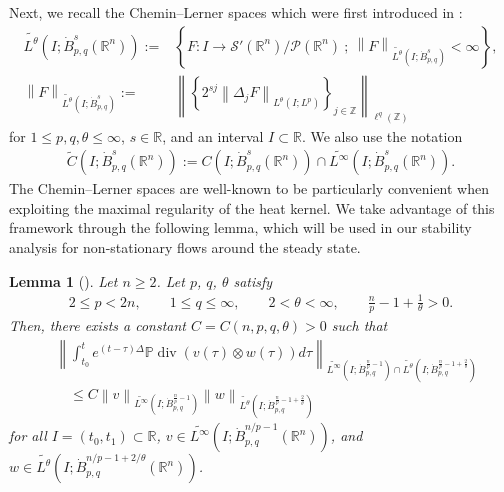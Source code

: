 \documentclass[a4paper,12pt,reqno]{amsart}
\theoremstyle{plain}
\newtheorem{lemm}[thm]{Lemma}
\theoremstyle{definition}
\renewcommand{\div}{\operatorname{div}}
\newcommand{\dB}{\dot{B}}
\renewcommand{\leq}{\leqslant}
\renewcommand{\geq}{\geqslant}
\newcommand{\n}[1]{{\left\|#1\right\|}}
\newcommand{\R}{\mathbb{R}}
\newcommand{\Mp}[1]{\left\{#1\right\}}
\begin{document}
Next, we recall 
the Chemin--Lerner spaces which were first introduced in \cite{Che-Ler-95}:
\begin{align}
    \widetilde{L^{\theta}}(I;\dB_{p,q}^s(\R^n))
    :={}&
    \Mp{
    F:I \to  \mathscr{S}'(\mathbb{R}^n)/\mathscr{P}(\mathbb{R}^n)
    \ ; \ 
    \n{F}_{\widetilde{L^{\theta}}(I;\dB_{p,q}^s)}
    <\infty
    },\\
    \n{F}_{\widetilde{L^{\theta}}(I;\dB_{p,q}^s)}
    :={}&
    \n{
    \Mp{
    2^{sj}
    \n{\Delta_j F}_{L^\theta(I;L^p)}
    }_{j \in \mathbb{Z}}
    }_{\ell^{q}(\mathbb{Z})}
\end{align}
for $1 \leq p,q,\theta \leq \infty$, $s \in \mathbb{R}$, and an interval $I \subset \R$.
We also use the notation
\begin{align}
    \widetilde{C}(I ; \dB_{p,q}^s(\mathbb{R}^n))
    :=
    C(I ; \dB_{p,q}^s(\mathbb{R}^n))
    \cap
    \widetilde{L^{\infty}}(I ; \dB_{p,q}^s(\mathbb{R}^n)).
\end{align}
The Chemin--Lerner spaces are well-known to be particularly convenient when exploiting the maximal regularity of the heat kernel. 
We take advantage of this framework through the following lemma, which will be used in our stability analysis for non-stationary flows around the steady state.
\begin{lemm}[\cite{Fuj-AIPHC}]\label{lemm:nonlin-Duha}
Let $n \geq 2$.
Let $p$, $q$, $\theta$ satisfy
\begin{align}
    2 \leq p < 2n,
    \qquad
    1 \leq q \leq \infty,
    \qquad 
    2<\theta < \infty,
    \qquad
    \frac{n}{p}
    -1+\frac{1}{\theta}>0.
    \label{p-r-theta}
\end{align}
Then, there exists a constant $C=C(n,p,q,\theta)>0$ such that
\begin{align}
    &\n{
    \int_{t_0}^t
    e^{(t-\tau)\Delta}
    \mathbb{P}\div(v(\tau) \otimes w(\tau))d\tau
    }_{\widetilde{L^{\infty}}(I;\dB_{p,q}^{\frac{n}{p}-1}) \cap \widetilde{L^{\theta}}(I;\dB_{p,q}^{\frac{n}{p}-1+\frac{2}{\theta}})}\\
    &\quad\leq
    C
    \n{v}_{\widetilde{L^{\infty}}(I;\dB_{p,q}^{\frac{n}{p}-1})}
    \n{w}_{\widetilde{L^{\theta}}(I;\dB_{p,q}^{\frac{n}{p}-1+\frac{2}{\theta}})}
\end{align}
for all 
$I=(t_0,t_1) \subset \mathbb{R}$, 
$v \in \widetilde{L^{\infty}}(I;\dB_{p,q}^{n/p-1}(\mathbb{R}^n))$, 
and 
$w \in \widetilde{L^\theta}(I;\dB_{p,q}^{n/p-1+2/\theta}(\mathbb{R}^n))$.
\end{lemm}
\end{document}
